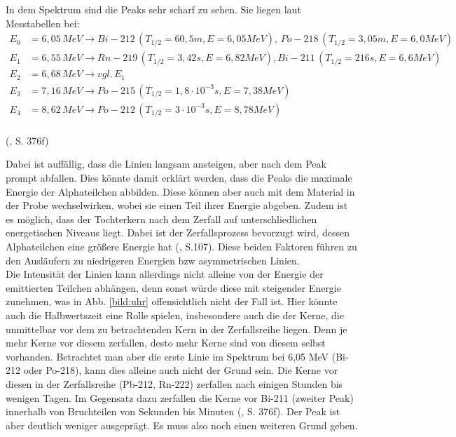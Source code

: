 In dem Spektrum sind die Peaks sehr scharf zu sehen. Sie liegen laut Messtabellen bei: \\

\begin{align*}
    E_0 &= 6,05 \, MeV \to Bi-212 \, (T_{1/2} = 60,5m, E = 6,05 MeV),\, Po-218 \, (T_{1/2} = 3,05m, E = 6,0 MeV) \\
    E_1 &= 6,55 \, MeV \to Rn-219 \, (T_{1/2} = 3,42s, E = 6,82 MeV), Bi-211 \, (T_{1/2} = 216s, E = 6,6 MeV)\\
    E_2 &= 6,68 \, MeV \to vgl. \, E_1 \\
    E_3 &= 7,16 \, MeV \to Po-215 \, (T_{1/2} = 1,8 \cdot 10^{-3}s, E = 7,38 MeV) \\
    E_4 &= 8,62 \, MeV \to Po-212 \, (T_{1/2} = 3 \cdot 10^{-3}s, E = 8,78 MeV) \\
\end{align*}

(\cite{Mende2016}, S. 376f)

Dabei ist auffällig, dass die Linien langsam ansteigen, aber nach dem Peak prompt abfallen. Dies könnte damit erklärt werden, dass 
die Peaks die maximale Energie der Alphateilchen abbilden. Diese können aber auch mit dem Material in der Probe wechselwirken, wobei 
sie einen Teil ihrer Energie abgeben. Zudem ist es 
möglich, dass der Tochterkern nach dem Zerfall auf unterschliedlichen energetischen Niveaus liegt. Dabei ist der Zerfallsprozess 
bevorzugt wird, dessen Alphateilchen eine größere Energie hat (\cite{Marmier1977}, S.107). Diese beiden Faktoren führen zu den Ausläufern 
zu niedrigeren Energien bzw asymmetrischen Linien. \\

Die Intensität der Linien kann allerdings nicht alleine von der Energie der emittierten Teilchen abhängen, denn sonst würde diese mit 
steigender Energie zunehmen, was in Abb. \ref{bild:uhr} offensichtlich nicht der Fall ist. Hier könnte auch die Halbwertszeit eine Rolle 
spielen, insbesondere auch die der Kerne, die unmittelbar vor dem zu betrachtenden Kern in der Zerfallsreihe liegen. Denn je mehr Kerne 
vor diesem zerfallen, desto mehr Kerne sind von diesem selbst vorhanden. Betrachtet man aber die erste Linie im Spektrum bei 6,05 MeV 
(Bi-212 oder Po-218), kann dies alleine auch nicht der Grund sein. Die Kerne vor diesen in der Zerfallsreihe (Pb-212, Rn-222) 
zerfallen nach einigen Stunden bis wenigen Tagen. Im Gegensatz dazu zerfallen die Kerne vor Bi-211 (zweiter Peak) innerhalb von 
Bruchteilen von Sekunden bis Minuten (\cite{Mende2016}, S. 376f). Der Peak ist aber deutlich weniger ausgeprägt. Es muss also noch einen 
weiteren Grund geben.



